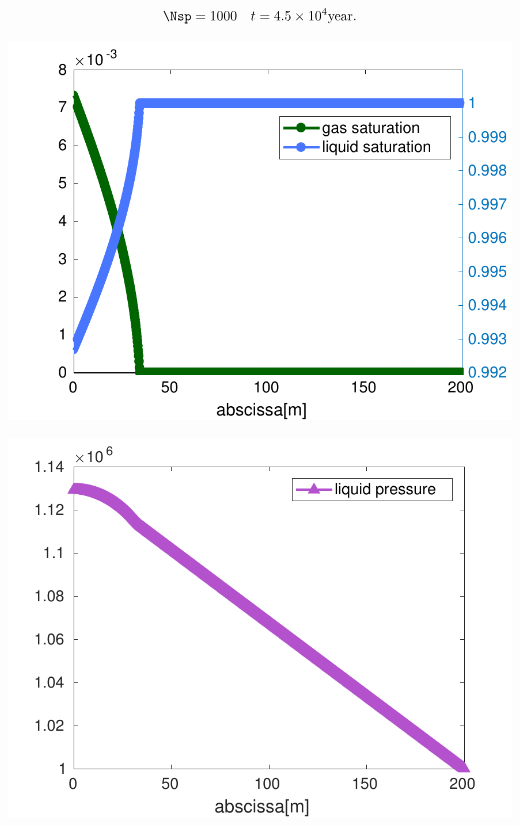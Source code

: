 \documentclass[a0,portrait]{a0poster}
\begin{document}
\begin{multicols}{2}
\begin{tcolorbox}
[enhanced, breakable,colback=white,frame style={left color=white!25!black,
right color=blue!75!black},
width=\dimexpr0.45\textwidth+18mm\relax,enlarge left by=0mm, title = \huge Numerical illustration, 
bottomrule=3mm, leftrule=1mm, toptitle = 3mm, bottomtitle = 3mm, center title]
\begin{equation*}
\Nsp=1000 \quad t=4.5 \times 10^4 \mathrm{year}.
\end{equation*}
\begin{minipage}[c]{.33\linewidth}
   \centering
\includegraphics[width=\textwidth]{image/image_Jad/modif_saturations_cv_solver_1000_cells-eps-converted-to}    
\end{minipage}\hfill
\begin{minipage}[c]{.32\linewidth}
   \centering
\includegraphics[width=\textwidth]{image/image_Jad/modif_liquid_pressure_cv_solver_1000_cells-eps-converted-to}    

\end{minipage}
\end{tcolorbox}
\end{multicols}
\end{document}
